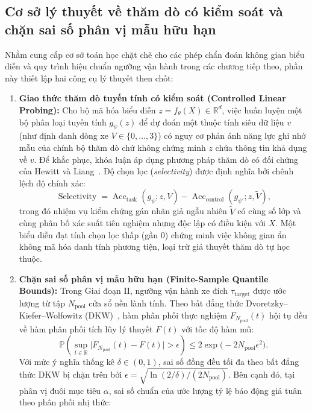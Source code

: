 \documentclass[12pt, a4paper, reqno, oneside]{book}
\begin{document}
\subsection{Cơ sở lý thuyết về thăm dò có kiểm soát và chặn sai số phân vị mẫu hữu hạn}\label{subsec:theory-probing-dkw}
Nhằm cung cấp cơ sở toán học chặt chẽ cho các phép chẩn đoán không gian biểu diễn và quy trình hiệu chuẩn ngưỡng vận hành trong các chương tiếp theo, phần này thiết lập hai công cụ lý thuyết then chốt:

\begin{enumerate}
    \item \textbf{Giao thức thăm dò tuyến tính có kiểm soát (Controlled Linear Probing):} Cho bộ mã hóa biểu diễn $z = f_\theta(X) \in \mathbb{R}^d$, việc huấn luyện một bộ phân loại tuyến tính $g_\psi(z)$ để dự đoán một thuộc tính siêu dữ liệu $v$ (như định danh dòng xe $V \in \{0, \ldots, 3\}$) có nguy cơ phản ánh năng lực ghi nhớ mẫu của chính bộ thăm dò chứ không chứng minh $z$ chứa thông tin khả dụng về $v$. Để khắc phục, khóa luận áp dụng phương pháp thăm dò có đối chứng của Hewitt và Liang~\cite{hewitt2019probes}. Độ chọn lọc (\textit{selectivity}) được định nghĩa bởi chênh lệch độ chính xác:
    \begin{equation}\label{eq:probe-selectivity}
    \operatorname{Selectivity} = \operatorname{Acc}_{\text{task}}(g_\psi; z, V) - \operatorname{Acc}_{\text{control}}(g_{\psi'}; z, \widetilde{V}),
    \end{equation}
    trong đó nhiệm vụ kiểm chứng gán nhãn giả ngẫu nhiên $\widetilde{V}$ có cùng số lớp và cùng phân bố xác suất tiên nghiệm nhưng độc lập có điều kiện với $X$. Một biểu diễn đạt tính chọn lọc thấp (gần $0$) chứng minh việc không gian ẩn không mã hóa danh tính phương tiện, loại trừ giả thuyết thăm dò tự học thuộc.
    \item \textbf{Chặn sai số phân vị mẫu hữu hạn (Finite-Sample Quantile Bounds):} Trong Giai đoạn II, ngưỡng vận hành xe đích $\tau_{\text{target}}$ được ước lượng từ tập $N_{\text{pool}}$ cửa sổ nền lành tính. Theo bất đẳng thức Dvoretzky--Kiefer--Wolfowitz (DKW)~\cite{massart1990dkw}, hàm phân phối thực nghiệm $F_{N_{\text{pool}}}(t)$ hội tụ đều về hàm phân phối tích lũy lý thuyết $F(t)$ với tốc độ hàm mũ:
    \begin{equation}\label{eq:dkw-inequality}
    \mathbb{P}\left(\sup_{t \in \mathbb{R}} \big| F_{N_{\text{pool}}}(t) - F(t) \big| > \epsilon\right) \le 2\exp\big(-2 N_{\text{pool}} \epsilon^2\big).
    \end{equation}
    Với mức ý nghĩa thống kê $\delta \in (0, 1)$, sai số đồng đều tối đa theo bất đẳng thức DKW bị chặn trên bởi $\epsilon = \sqrt{\ln(2/\delta)/(2N_{\text{pool}})}$. Bên cạnh đó, tại phân vị đuôi mục tiêu $\alpha$, sai số chuẩn của ước lượng tỷ lệ báo động giả tuân theo phân phối nhị thức:

\end{enumerate}
\end{document}
